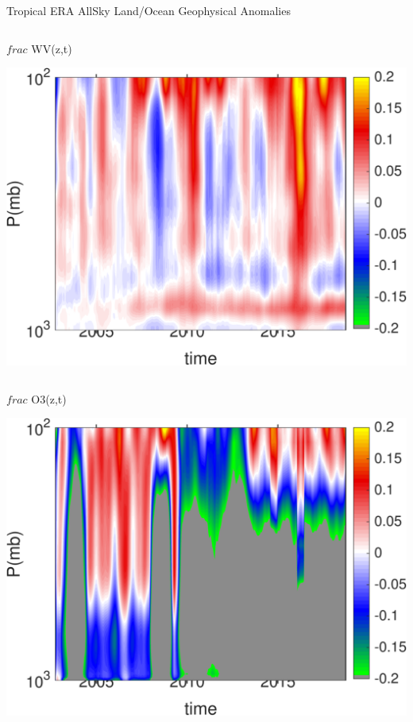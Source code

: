 \documentclass[10pt,t]{beamer}
\begin{document}
\begin{frame}{Tropical ERA AllSky Land/Ocean Geophysical Anomalies}
\begin{columns}
\begin{column}{0.45\columnwidth}
\begin{block}{\footnotesize $frac$ WV(z,t)}
\vspace{-0.1in}
\begin{center}
\includegraphics[width=\linewidth]{Figs/CloudAnom/Desc_ocean_orig/era_cld_wv_anom_200209_201808.png}
\end{center}
\end{block}
\end{column}
\end{columns}

\vspace{-0.25in}

\begin{columns}
\begin{column}{0.45\columnwidth}
\begin{block}{\footnotesize $frac$ O3(z,t)}
\vspace{-0.1in}
\begin{center}
\includegraphics[width=\linewidth]{Figs/CloudAnom/Desc_ocean_orig/era_cld_o3_anom_200209_201808.png}
\end{center}
\end{block}
\end{column}


\end{columns}
\end{frame}
\end{document}
